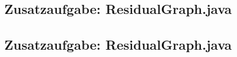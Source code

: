 \documentclass[a4paper,11pt,twoside]{scrartcl}
\begin{document}
\subsection*{Zusatzaufgabe: ResidualGraph.java}

\subsection*{Zusatzaufgabe: ResidualGraph.java}

\end{document}
